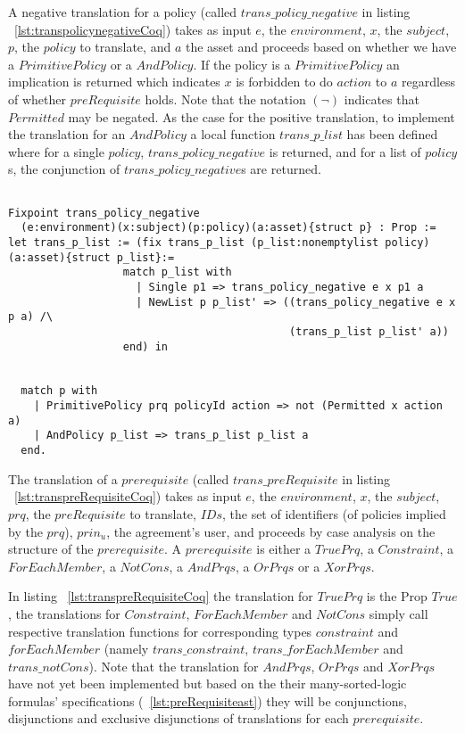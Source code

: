 A negative translation for a policy (called $trans\_policy\_negative$ in listing ~\ref{lst:transpolicynegativeCoq}) takes as input $e$, the $environment$, $x$, the $subject$, $p$, the $policy$ to translate, and $a$ the asset and proceeds based on whether we have a $PrimitivePolicy$ or a $AndPolicy$. If the policy is a $PrimitivePolicy$ an implication is returned which indicates $x$ is forbidden to do $action$ to $a$ regardless of whether $preRequisite$ holds. Note that the notation $(\lnot)$ indicates that $Permitted$ may be negated. As the case for the positive translation, to implement the translation for an $AndPolicy$ a local function $trans\_p\_list$ has been defined where for a single $policy$, $trans\_policy\_negative$ is returned, and for a list of $policy$s, the conjunction of $trans\_policy\_negative$s are returned.


\begin{minipage}[c]{0.95\textwidth}
\begin{lstlisting}

Fixpoint trans_policy_negative
  (e:environment)(x:subject)(p:policy)(a:asset){struct p} : Prop :=
let trans_p_list := (fix trans_p_list (p_list:nonemptylist policy)(a:asset){struct p_list}:=
                  match p_list with
                    | Single p1 => trans_policy_negative e x p1 a
                    | NewList p p_list' => ((trans_policy_negative e x p a) /\ 
                                            (trans_p_list p_list' a))
                  end) in


  match p with
    | PrimitivePolicy prq policyId action => not (Permitted x action a)
    | AndPolicy p_list => trans_p_list p_list a
  end.
\end{lstlisting}
\end{minipage}

The translation of a $prerequisite$ (called $trans\_preRequisite$ in listing ~\ref{lst:transpreRequisiteCoq}) takes as input $e$, the $environment$, $x$, the $subject$, $prq$, the $preRequisite$ to translate, $IDs$, the set of identifiers (of policies implied by the $prq$), $prin_{u}$, the agreement's user, and proceeds by case analysis on the structure of the $prerequisite$. A $prerequisite$ is either a $TruePrq$, a $Constraint$, a $ForEachMember$, a $NotCons$, a $AndPrqs$, a $OrPrqs$ or a $XorPrqs$. 

In listing ~\ref{lst:transpreRequisiteCoq} the translation for $TruePrq$ is the Prop $True$, the translations for $Constraint$, $ForEachMember$ and $NotCons$ simply call respective translation functions for corresponding types $constraint$ and $forEachMember$ (namely $trans\_constraint$, $trans\_forEachMember$ and $trans\_notCons$). Note that the translation for $AndPrqs$, $OrPrqs$ and $XorPrqs$ have not yet been implemented but based on the their many-sorted-logic formulas' specifications (~\ref{lst:preRequisiteast}) they will be conjunctions, disjunctions and exclusive disjunctions of translations for each $prerequisite$.

